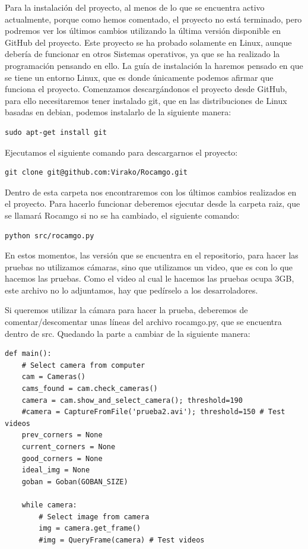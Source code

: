 \documentclass[12pt,a4paper]{report}
\begin{document}
Para la instalación del proyecto, al menos de lo que se encuentra activo
actualmente, porque como hemos comentado, el proyecto no está terminado, pero
podremos ver los últimos cambios utilizando la última versión disponible en
GitHub del proyecto. Este proyecto se ha probado solamente en Linux, aunque
debería de funcionar en otros Sistemas operativos, ya que se ha realizado la
programación pensando en ello. 
La guía de instalación la haremos pensado en que se tiene un entorno Linux, que
es donde únicamente podemos afirmar que funciona el proyecto. Comenzamos
descargándonos el proyecto desde GitHub, para ello necesitaremos tener instalado
git, que en las distribuciones de Linux basadas en debian, podemos instalarlo de
la siguiente manera: 

\begin{verbatim}
sudo apt-get install git
\end{verbatim}

Ejecutamos el siguiente comando para descargarnos el proyecto: 

\begin{verbatim}
git clone git@github.com:Virako/Rocamgo.git
\end{verbatim}

Dentro de esta carpeta nos encontraremos con los últimos cambios realizados en
el proyecto. Para hacerlo funcionar deberemos ejecutar desde la carpeta raiz,
que se llamará Rocamgo si no se ha cambiado, el siguiente comando:

\begin{verbatim}
python src/rocamgo.py
\end{verbatim}

En estos momentos, las versión que se encuentra en el repositorio, para hacer
las pruebas no utilizamos cámaras, sino que utilizamos un video, que es con lo
que hacemos las pruebas. Como el video al cual le hacemos las pruebas ocupa 3GB,
este archivo no lo adjuntamos, hay que pedírselo a los desarroladores. 

Si queremos utilizar la cámara para hacer la prueba, deberemos de
comentar/descomentar unas líneas del archivo rocamgo.py, que se encuentra dentro
de src. Quedando la parte a cambiar de la siguiente manera: %

\begin{verbatim}
def main():
    # Select camera from computer
    cam = Cameras()
    cams_found = cam.check_cameras()
    camera = cam.show_and_select_camera(); threshold=190
    #camera = CaptureFromFile('prueba2.avi'); threshold=150 # Test videos
    prev_corners = None
    current_corners = None
    good_corners = None
    ideal_img = None
    goban = Goban(GOBAN_SIZE)

    while camera: 
        # Select image from camera 
        img = camera.get_frame()
        #img = QueryFrame(camera) # Test videos
\end{verbatim}
\end{document}

